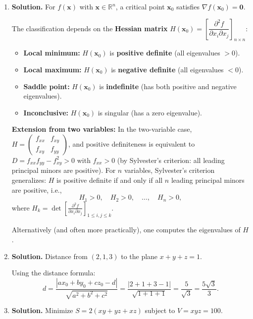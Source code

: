 \begin{enumerate}
\item \textbf{Solution.}
For $f(\mathbf{x})$ with $\mathbf{x} \in \mathbb{R}^n$, a critical point $\mathbf{x}_0$ satisfies $\nabla f(\mathbf{x}_0) = \mathbf{0}$.

The classification depends on the \textbf{Hessian matrix} $H(\mathbf{x}_0) = \left[\dfrac{\partial^2 f}{\partial x_i \partial x_j}\right]_{n \times n}$:

\begin{itemize}
    \item \textbf{Local minimum:} $H(\mathbf{x}_0)$ is \textbf{positive definite} (all eigenvalues $> 0$).
    \item \textbf{Local maximum:} $H(\mathbf{x}_0)$ is \textbf{negative definite} (all eigenvalues $< 0$).
    \item \textbf{Saddle point:} $H(\mathbf{x}_0)$ is \textbf{indefinite} (has both positive and negative eigenvalues).
    \item \textbf{Inconclusive:} $H(\mathbf{x}_0)$ is singular (has a zero eigenvalue).
\end{itemize}

\textbf{Extension from two variables:} In the two-variable case, $H = \begin{pmatrix} f_{xx} & f_{xy} \\ f_{xy} & f_{yy}\end{pmatrix}$, and positive definiteness is equivalent to $D = f_{xx}f_{yy} - f_{xy}^2 > 0$ with $f_{xx} > 0$ (by Sylvester's criterion: all leading principal minors are positive). For $n$ variables, Sylvester's criterion generalizes: $H$ is positive definite if and only if all $n$ leading principal minors are positive, i.e.,
\[
H_1 > 0, \quad H_2 > 0, \quad \ldots, \quad H_n > 0,
\]
where $H_k = \det\!\left[\frac{\partial^2 f}{\partial x_i \partial x_j}\right]_{1 \leq i,j \leq k}$.

Alternatively (and often more practically), one computes the eigenvalues of $H$.


\item \textbf{Solution.}
Distance from $(2,1,3)$ to the plane $x + y + z = 1$.

Using the distance formula:
\[
d = \frac{|ax_0 + by_0 + cz_0 - d|}{\sqrt{a^2+b^2+c^2}} = \frac{|2 + 1 + 3 - 1|}{\sqrt{1+1+1}} = \frac{5}{\sqrt{3}} = \boxed{\frac{5\sqrt{3}}{3}}.
\]

\item \textbf{Solution.}
Minimize $S = 2(xy + yz + xz)$ subject to $V = xyz = 100$.


\end{enumerate}

